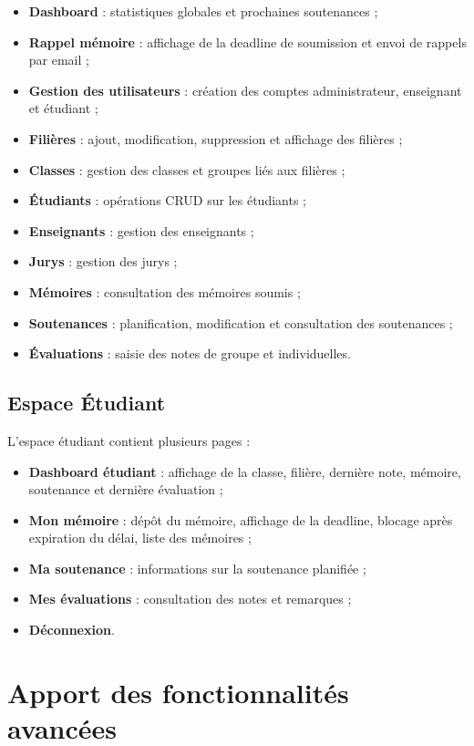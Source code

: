 \documentclass[a4paper,12pt,oneside]{report}
\begin{document}
\begin{itemize}
    \item \textbf{Dashboard} : statistiques globales et prochaines soutenances ;
    \item \textbf{Rappel mémoire} : affichage de la deadline de soumission et envoi de rappels par email ;
    \item \textbf{Gestion des utilisateurs} : création des comptes administrateur, enseignant et étudiant ;
    \item \textbf{Filières} : ajout, modification, suppression et affichage des filières ;
    \item \textbf{Classes} : gestion des classes et groupes liés aux filières ;
    \item \textbf{Étudiants} : opérations CRUD sur les étudiants ;
    \item \textbf{Enseignants} : gestion des enseignants ;
    \item \textbf{Jurys} : gestion des jurys ;
    \item \textbf{Mémoires} : consultation des mémoires soumis ;
    \item \textbf{Soutenances} : planification, modification et consultation des soutenances ;
    \item \textbf{Évaluations} : saisie des notes de groupe et individuelles.
\end{itemize}

\subsection{Espace Étudiant}

L'espace étudiant contient plusieurs pages :

\begin{itemize}
    \item \textbf{Dashboard étudiant} : affichage de la classe, filière, dernière note, mémoire, soutenance et dernière évaluation ;
    \item \textbf{Mon mémoire} : dépôt du mémoire, affichage de la deadline, blocage après expiration du délai, liste des mémoires ;
    \item \textbf{Ma soutenance} : informations sur la soutenance planifiée ;
    \item \textbf{Mes évaluations} : consultation des notes et remarques ;
    \item \textbf{Déconnexion}.
\end{itemize}

\section{Apport des fonctionnalités avancées}
\end{document}
